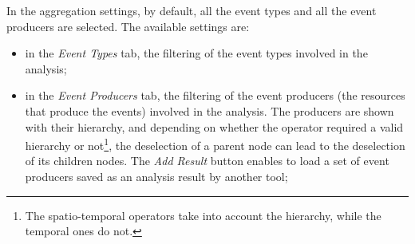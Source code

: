 \documentclass[twoside]{article}
\begin{document}
\begin{sloppypar}
In the aggregation settings, by default, all the event types and all the event producers are selected. The available settings are:
\begin{itemize}
	\item in the \textit{Event Types} tab, the filtering of the event types involved in the analysis;
	\item in the \textit{Event Producers} tab, the filtering of the event producers (the resources that produce the events) involved in the analysis. The producers are shown with their hierarchy, and depending on whether the operator required a valid hierarchy or not\footnote{The spatio-temporal operators take into account the hierarchy, while the temporal ones do not.}, the deselection of a parent node can lead to the deselection of its children nodes. The \textit{Add Result} button enables to load a set of event producers saved as an analysis result by another tool;
\end{itemize}


\end{sloppypar}
\end{document}
